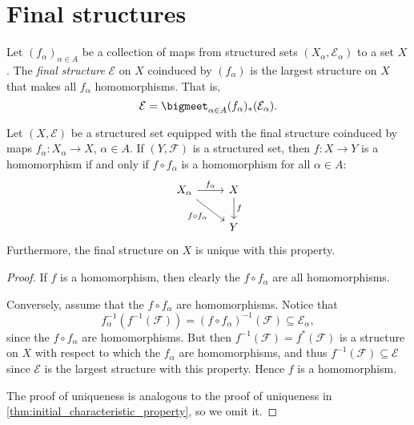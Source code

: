 \documentclass[article, a4paper, 11pt, oneside]{memoir}
\numberwithin{equation}{chapter}
\newcommand{\calE}{\mathcal{E}}
\newcommand{\calF}{\mathcal{F}}
\newcommand{\preim}{^{-1}}
\begin{document}
\section{Final structures}

\begin{definition}
    Let $(f_\alpha)_{\alpha \in A}$ be a collection of maps from structured sets $(X_\alpha, \calE_\alpha)$ to a set $X$. The \emph{final structure} $\calE$ on $X$ coinduced by $(f_\alpha)$ is the largest structure on $X$ that makes all $f_\alpha$ homomorphisms. That is,
    \begin{equation*}
        \calE
            = \bigmeet_{\alpha \in A} (f_\alpha)_*(\calE_\alpha).
    \end{equation*}
\end{definition}


\begin{theorem}
    Let $(X,\calE)$ be a structured set equipped with the final structure coinduced by maps $f_\alpha \colon X_\alpha \to X$,  $\alpha \in A$. If $(Y,\calF)$ is a structured set, then $f \colon X \to Y$ is a homomorphism if and only if $f \circ f_\alpha$ is a homomorphism for all $\alpha \in A$:
    \begin{equation*}
        \begin{tikzcd}
            X_\alpha
                \ar[r, "f_\alpha"]
                \ar[dr, "f \circ f_\alpha", swap]
            & X
                \ar[d, "f"] \\
            & Y
        \end{tikzcd}
    \end{equation*}
    Furthermore, the final structure on $X$ is unique with this property.
\end{theorem}

\begin{proof}
    If $f$ is a homomorphism, then clearly the $f \circ f_\alpha$ are all homomorphisms.

    Conversely, assume that the $f \circ f_\alpha$ are homomorphisms. Notice that
    \begin{equation*}
        f_\alpha\preim(f\preim(\calF))
            = (f \circ f_\alpha)\preim(\calF)
            \subseteq \calE_\alpha,
    \end{equation*}
    since the $f \circ f_\alpha$ are homomorphisms. But then $f\preim(\calF) = f^*(\calF)$ is a structure on $X$ with respect to which the $f_\alpha$ are homomorphisms, and thus $f\preim(\calF) \subseteq \calE$ since $\calE$ is the largest structure with this property. Hence $f$ is a homomorphism.

    The proof of uniqueness is analogous to the proof of uniqueness in \cref{thm:initial_characteristic_property}, so we omit it.
\end{proof}
\end{document}
